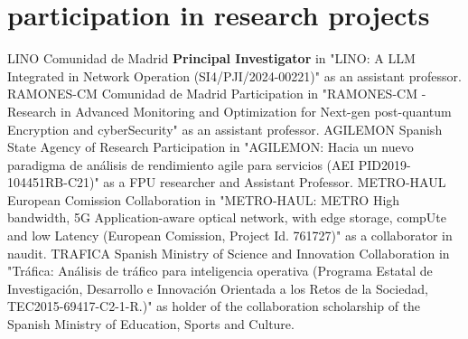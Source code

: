\documentclass[]{friggeri-cv}
\begin{document}
\section{participation in research projects}
\vspace{-1em}
\begin{entrylist}
{LINO}
{Comunidad de Madrid}
{\textbf{Principal Investigator} in "LINO: A LLM Integrated in Network Operation (SI4/PJI/2024-00221)" as an assistant professor.
}
{RAMONES-CM}
{Comunidad de Madrid}
{Participation in "RAMONES-CM - Research in Advanced Monitoring and Optimization for Next-gen post-quantum Encryption and cyberSecurity" as an assistant professor.
}
{AGILEMON}
{Spanish State Agency of Research}
{Participation in "AGILEMON: Hacia un nuevo paradigma de análisis de rendimiento agile para servicios (AEI PID2019-104451RB-C21)" as a FPU researcher and Assistant Professor.
}
{METRO-HAUL}
{European Comission}
{Collaboration in "METRO-HAUL: METRO High bandwidth, 5G Application-aware optical network, with edge storage, compUte and low Latency (European Comission, Project Id. 761727)" as a collaborator in naudit.
}
{TRAFICA}
{Spanish Ministry of Science and Innovation}
{Collaboration in  "Tráfica: Análisis de tráfico para inteligencia operativa (Programa Estatal de Investigación, Desarrollo e Innovación Orientada a los Retos de la Sociedad, TEC2015-69417-C2-1-R.)" as holder of the collaboration scholarship of the Spanish Ministry of Education, Sports and Culture.
}
\end{entrylist}
\vspace{-2em}
\end{document}
